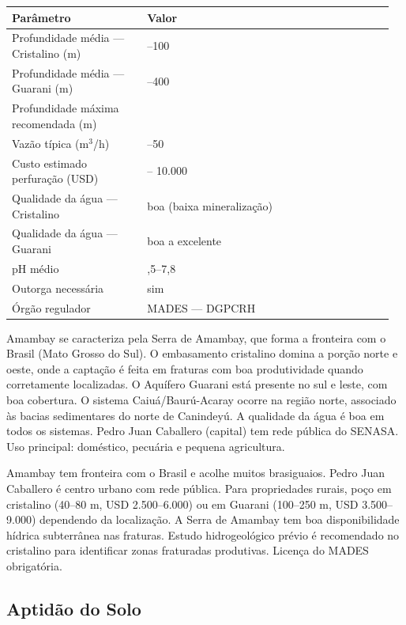 {\small
\setlength{\tabcolsep}{3pt}
\renewcommand{\arraystretch}{1.12}
\begin{tabularx}{\linewidth}{>{\raggedright\arraybackslash}p{0.34\linewidth} >{\raggedright\arraybackslash}p{0.62\linewidth}}
\toprule
Parâmetro & Valor \\
\midrule
Profundidade média --- Cristalino (m) & 40--100 \\
Profundidade média --- Guarani (m) & 100--400 \\
Profundidade máxima recomendada (m) & 450 \\
Vazão típica (m$^3$/h) & 5--50 \\
Custo estimado perfuração (USD) & 2.500 -- 10.000 \\
Qualidade da água --- Cristalino & boa (baixa mineralização) \\
Qualidade da água --- Guarani & boa a excelente \\
pH médio & 6,5--7,8 \\
Outorga necessária & sim \\
Órgão regulador & MADES --- DGPCRH \\
\bottomrule
\end{tabularx}
}


Amambay se caracteriza pela Serra de Amambay, que forma a fronteira com o Brasil (Mato Grosso do Sul). O embasamento cristalino domina a porção norte e oeste, onde a captação é feita em fraturas com boa produtividade quando corretamente localizadas. O Aquífero Guarani está presente no sul e leste, com boa cobertura. O sistema Caiuá/Baurú-Acaray ocorre na região norte, associado às bacias sedimentares do norte de Canindeyú. A qualidade da água é boa em todos os sistemas. Pedro Juan Caballero (capital) tem rede pública do SENASA. Uso principal: doméstico, pecuária e pequena agricultura.


Amambay tem fronteira com o Brasil e acolhe muitos brasiguaios. Pedro Juan Caballero é centro urbano com rede pública. Para propriedades rurais, poço em cristalino (40--80 m, USD 2.500--6.000) ou em Guarani (100--250 m, USD 3.500--9.000) dependendo da localização. A Serra de Amambay tem boa disponibilidade hídrica subterrânea nas fraturas. Estudo hidrogeológico prévio é recomendado no cristalino para identificar zonas fraturadas produtivas. Licença do MADES obrigatória.




\subsection{Aptidão do Solo}



